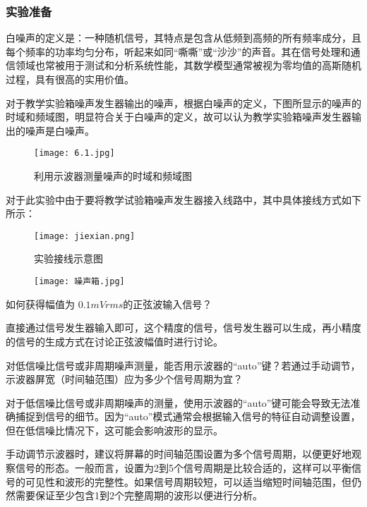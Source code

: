 \documentclass[dvipsnames, svgnames,a4paper,11pt]{article}
\begin{document}
\subsubsection{实验准备}
白噪声的定义是：一种随机信号，其特点是包含从低频到高频的所有频率成分，且每个频率的功率均匀分布，听起来如同“嘶嘶”或“沙沙”的声音。其在信号处理和通信领域也常被用于测试和分析系统性能，其数学模型通常被视为零均值的高斯随机过程，具有很高的实用价值。

对于教学实验箱噪声发生器输出的噪声，根据白噪声的定义，下图所显示的噪声的时域和频域图，明显符合关于白噪声的定义，故可以认为教学实验箱噪声发生器输出的噪声是白噪声。
\begin{figure}[htbp]
	\centering
	\texttt{[image: 6.1.jpg]}
	\caption{利用示波器测量噪声的时域和频域图}
	\label{内利用示波器测量噪声的时域和频域图}
	\end{figure}
	对于此实验中由于要将教学试验箱噪声发生器接入线路中，其中具体接线方式如下所示：
	\begin{figure}[{H}]
		\centering
		\texttt{[image: jiexian.png]}
		\caption{实验接线示意图}
		\label{}
	\end{figure}
	\begin{figure}[{H}]
		\centering
		\texttt{[image: 噪声箱.jpg]}
		\caption{}
		\label{}
	\end{figure}
	\begin{question}
		如何获得幅值为 $0.1mVrms $的正弦波输入信号？
	\end{question}
直接通过信号发生器输入即可，这个精度的信号，信号发生器可以生成，再小精度的信号的生成方式在讨论正弦波幅值时进行讨论。
\begin{question}
	对低信噪比信号或非周期噪声测量，能否用示波器的“auto”键？若通过手动调节，示波器屏宽（时间轴范围）应为多少个信号周期为宜？
\end{question}
对于低信噪比信号或非周期噪声的测量，使用示波器的“auto”键可能会导致无法准确捕捉到信号的细节。因为“auto”模式通常会根据输入信号的特征自动调整设置，但在低信噪比情况下，这可能会影响波形的显示。

手动调节示波器时，建议将屏幕的时间轴范围设置为多个信号周期，以便更好地观察信号的形态。一般而言，设置为2到5个信号周期是比较合适的，这样可以平衡信号的可见性和波形的完整性。如果信号周期较短，可以适当缩短时间轴范围，但仍然需要保证至少包含1到2个完整周期的波形以便进行分析。
\end{document}
